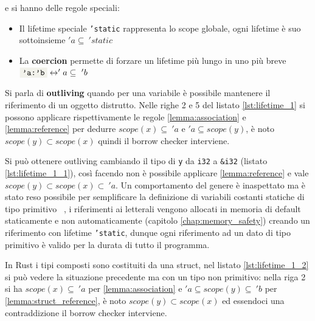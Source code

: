 \documentclass[Lau,binding=0.6cm]{sapthesis}
\newcommand{\textcode}[1]{\colorbox{backcolour}{\texttt{#1}}}
\begin{document}
e si hanno delle regole speciali:
\begin{itemize}
    \item Il lifetime speciale \textcode{'static} rappresenta lo scope globale, ogni lifetime è suo sottoinsieme $ 'a \subseteq \ 'static $
    \item La \textbf{coercion} permette di forzare un lifetime più lungo in uno più breve $ \textnormal{\textcode{'a:'b}} \leftrightarrow 'a \subseteq \ 'b $
\end{itemize}

Si parla di \textbf{outliving} quando per una variabile è possibile mantenere il riferimento di un oggetto distrutto. 
Nelle righe 2 e 5 del listato \ref{lst:lifetime_1} si possono applicare rispettivamente le regole \ref{lemma:association} e \ref{lemma:reference} per dedurre $ scope(x) \subseteq \ 'a $ e $ 'a \subseteq scope(y) $, è noto $ scope(y) \subset scope(x) $ quindi il borrow checker interviene.




Si può ottenere outliving cambiando il tipo di \textcode{y} da \textcode{i32} a \textcode{\&i32} (listato \ref{lst:lifetime_1_1}), così facendo non è possibile applicare \ref{lemma:reference} e vale $ scope(y) \subset scope(x) \subset \ 'a $. 
Un comportamento del genere è inaspettato ma è stato reso possibile per semplificare la definizione di variabili costanti statiche di tipo primitivo ~\cite{git:outliving_static}, i riferimenti ai letterali vengono allocati in memoria di default staticamente e non automaticamente (capitolo \ref{chap:memory_safety}) creando un riferimento con lifetime \textcode{'static}, dunque ogni riferimento ad un dato di tipo primitivo è valido per la durata di tutto il programma.




In Rust i tipi composti sono costituiti da una struct, nel listato \ref{lst:lifetime_1_2} si può vedere la situazione precedente ma con un tipo non primitivo: nella riga 2 si ha $ scope(x) \subseteq \ 'a $ per \ref{lemma:association} e $ 'a \subseteq scope(y) \subseteq \ 'b$ per \ref{lemma:struct_reference}, è noto $ scope(y) \subset scope(x) $ ed essendoci una contraddizione il borrow checker interviene.  
\end{document}
